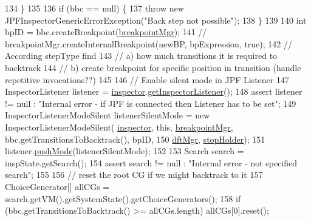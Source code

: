 \begin{DoxyCode}
134     \}
135 
136     \textcolor{keywordflow}{if} (bbc == null) \{
137       \textcolor{keywordflow}{throw} \textcolor{keyword}{new} JPFInspectorGenericErrorException(\textcolor{stringliteral}{"Back step not possible"});
138     \}
139 
140     \textcolor{keywordtype}{int} bpID = bbc.createBreakpoint(\hyperlink{classgov_1_1nasa_1_1jpf_1_1inspector_1_1server_1_1breakpoints_1_1_commands_manager_abdc258b16cc838a9d7431d9ddd04e424}{breakpointMgr});
141     \textcolor{comment}{// breakpointMgr.createInternalBreakpoint(newBP, bpExpression, true);}
142     \textcolor{comment}{// According stepType find}
143     \textcolor{comment}{// a) how much transitions it is required to backtrack}
144     \textcolor{comment}{// b) create breakpoint for specific position in transition (handle repetitive invocations??)}
145 
146     \textcolor{comment}{// Enable silent mode in JPF Listener}
147     InspectorListener listener = \hyperlink{classgov_1_1nasa_1_1jpf_1_1inspector_1_1server_1_1breakpoints_1_1_commands_manager_a281675efc13e0f7e311b76bc7590a6ec}{inspector}.\hyperlink{classgov_1_1nasa_1_1jpf_1_1inspector_1_1server_1_1jpf_1_1_j_p_f_inspector_abecd4143627640215d6f2db707718b03}{getInspectorListener}();
148     assert listener != null : \textcolor{stringliteral}{"Internal error - if JPF is connected then Listener has to be set"};
149     InspectorListenerModeSilent listenerSilentMode = \textcolor{keyword}{new} InspectorListenerModeSilent(
      \hyperlink{classgov_1_1nasa_1_1jpf_1_1inspector_1_1server_1_1breakpoints_1_1_commands_manager_a281675efc13e0f7e311b76bc7590a6ec}{inspector}, \textcolor{keyword}{this}, \hyperlink{classgov_1_1nasa_1_1jpf_1_1inspector_1_1server_1_1breakpoints_1_1_commands_manager_abdc258b16cc838a9d7431d9ddd04e424}{breakpointMgr}, bbc.getTransitionsToBacktrack(), bpID,
150         \hyperlink{classgov_1_1nasa_1_1jpf_1_1inspector_1_1server_1_1breakpoints_1_1_commands_manager_a74b9803b08950f6fec6f004f5fe10308}{dftMgr}, \hyperlink{classgov_1_1nasa_1_1jpf_1_1inspector_1_1server_1_1breakpoints_1_1_commands_manager_a3573f950aba2548e59f2c4f7c193b307}{stopHolder});
151     listener.\hyperlink{classgov_1_1nasa_1_1jpf_1_1inspector_1_1server_1_1jpf_1_1_inspector_listener_a21f414a408a95deadcada13c497967b5}{pushMode}(listenerSilentMode);
152 
153     Search search = inspState.getSearch();
154     assert search != null : \textcolor{stringliteral}{"Internal error - not specified search"};
155 
156     \textcolor{comment}{// reset the root CG if we might backtrack to it}
157   ChoiceGenerator[] allCGs = search.getVM().getSystemState().getChoiceGenerators();
158   \textcolor{keywordflow}{if} (bbc.getTransitionsToBacktrack() >= allCGs.length) allCGs[0].reset();

\end{DoxyCode}
